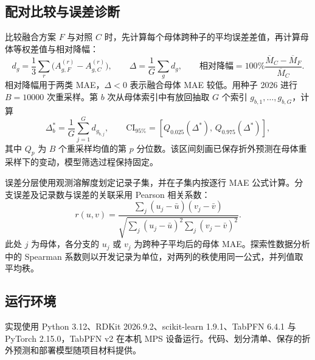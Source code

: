\subsection{配对比较与误差诊断}
比较融合方案 $F$ 与对照 $C$ 时，先计算每个母体跨种子的平均误差差值，再计算母体等权差值与相对降幅：
\begin{equation}
d_g=\frac13\sum_r\big(A^{(r)}_{g,F}-A^{(r)}_{g,C}\big),\qquad
\Delta=\frac1G\sum_g d_g,\qquad
\text{相对降幅}=100\%\frac{\overline M_C-\overline M_F}{\overline M_C}.
\end{equation}
相对降幅用于两类 MAE，$\Delta<0$ 表示融合母体 MAE 较低。用种子 2026 进行 $B=10000$ 次重采样。第 $b$ 次从母体索引中有放回抽取 $G$ 个索引 $g_{b,1},\ldots,g_{b,G}$，计算
\begin{equation}
\Delta_b^*=\frac{1}{G}\sum_{j=1}^{G}d_{g_{b,j}},\qquad
\mathrm{CI}_{95\%}=[Q_{0.025}(\Delta^*),\,Q_{0.975}(\Delta^*)],
\end{equation}
其中 $Q_p$ 为 $B$ 个重采样均值的第 $p$ 分位数。该区间刻画已保存折外预测在母体重采样下的变动，模型筛选过程保持固定。

误差分层使用观测溶解度划定记录子集，并在子集内按逐行 MAE 公式计算。分支误差及记录数与误差的关联采用 Pearson 相关系数：
\begin{equation}
r(u,v)=\frac{\sum_j(u_j-\bar u)(v_j-\bar v)}
{\sqrt{\sum_j(u_j-\bar u)^2\sum_j(v_j-\bar v)^2}} .
\end{equation}
此处 $j$ 为母体，各分支的 $u_j$ 或 $v_j$ 为跨种子平均后的母体 MAE。探索性数据分析中的 Spearman 系数则以开发记录为单位，对两列的秩使用同一公式，并列值取平均秩。

\subsection{运行环境}
实现使用 Python 3.12、RDKit 2026.9.2、scikit-learn 1.9.1、TabPFN 6.4.1 与 PyTorch 2.15.0，TabPFN v2 在本机 MPS 设备运行。代码、划分清单、保存的折外预测和部署模型随项目材料提供。
